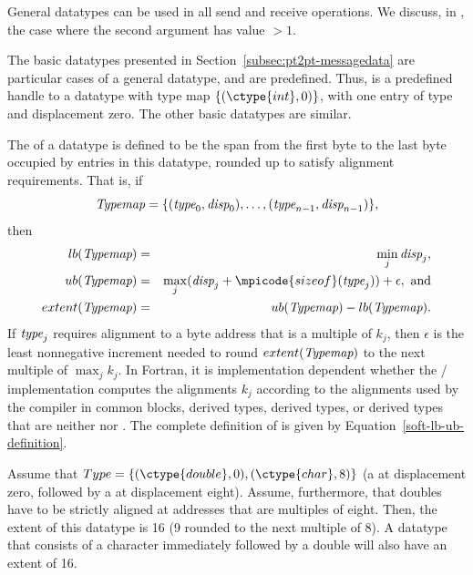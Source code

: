 General datatypes can be used in all send and receive
operations.  We discuss, in , the
case where the second argument  has value $> 1$.

The basic datatypes presented in
Section~\ref{subsec:pt2pt-messagedata}
are particular cases of a general datatype, and are predefined.
Thus,  is a predefined handle to a datatype with type
map $\{ (\ctype{int}, 0) \}$, with one entry of type  and
displacement zero.  The other basic datatypes are similar.

The  of a datatype is defined to
be the span from the first byte to the last byte occupied by entries in this
datatype, rounded up to satisfy alignment requirements.
That is, if
\[
\textrm{\itshape{Typemap}} = \{ (\textrm{\itshape{type}}_0,\textrm{\itshape{disp}}_0), \ldots , (\textrm{\itshape{type}}_{n-1}, \textrm{\itshape{disp}}_{n-1}) \} ,
\]
then
\begin{eqnarray}
lb(\mword{Typemap}) & = & \min_j \mword{disp}_j , \nonumber \\
ub(\mword{Typemap}) & = & \max_j (\mword{disp}_j + \mpicode{sizeof}(\mword{type}_j)) + \epsilon , \mbox{ and}
\nonumber \\ extent(\mword{Typemap}) & = & ub(\mword{Typemap}) - lb(\mword{Typemap}).
\label{soft-lb-ub-definition}
\end{eqnarray}
If $\textrm{\itshape{type}}_j$ requires alignment to a byte address that
is
a multiple
of $k_j$,
then $\epsilon$ is the least nonnegative increment needed to round
$extent(\textrm{\itshape{Typemap}})$ to the next multiple of $\max_j k_j$.
In Fortran, it is implementation dependent whether the \MPI/ implementation
computes the alignments $k_j$ according to the alignments
used by the compiler in common blocks,  derived types,
 derived types,
or derived types that are neither  nor .
The complete definition of  is given
by Equation~\ref{soft-lb-ub-definition}.


\begin{example}
\label{pt2pt-exR}
%
%
Assume that
$Type = \{ (\ctype{double},0), (\ctype{char}, 8) \}$
(a  at
displacement zero, followed by a  at displacement eight).
Assume, furthermore, that
doubles have to be strictly aligned at addresses that are multiples of eight.
Then, the extent of this datatype is 16 (9 rounded to the next multiple of 8).
A datatype that consists of a character immediately followed by a double will
also have an extent of 16.
\end{example}

